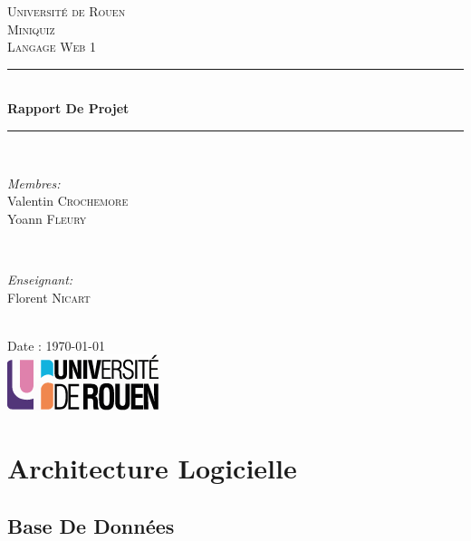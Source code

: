 \documentclass[12pt]{article}
\begin{document}
\begin{titlepage}

\newcommand{\HRule}{\rule{\linewidth}{0.5mm}}

\center

\textsc{\LARGE Université de Rouen}\\[1.5cm]
\textsc{\Large Miniquiz}\\[0.5cm]
\textsc{\large Langage Web 1}\\[0.5cm]

\HRule \\[0.4cm]
{ \huge \bfseries Rapport De Projet}\\[0.2cm] %
\HRule \\[1.5cm]

  \begin{minipage}{0.4\textwidth}
    \begin{flushleft} \large
      \emph{Membres:}\\
      Valentin \textsc{Crochemore}\\
      Yoann \textsc{Fleury}
    \end{flushleft}
  \end{minipage}
  ~
  \begin{minipage}{0.4\textwidth}
    \begin{flushright} \large
      \emph{Enseignant:} \\
      Florent \textsc{Nicart}
    \end{flushright}
  \end{minipage}\\[3cm]


  {\large Date : \today}\\[3cm]

  \includegraphics{res/logo.png}\\[1cm]

  \vfill
\end{titlepage}

\newpage
\tableofcontents
\newpage

\section{Architecture Logicielle}
    \subsection{Base De Données}
\end{document}
